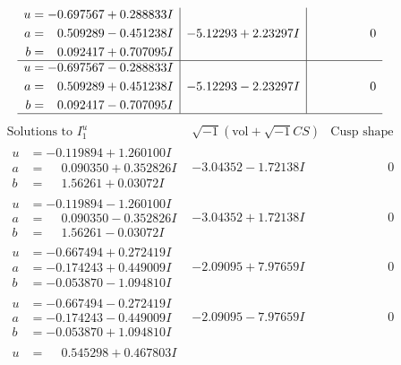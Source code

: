 \documentclass[1p]{elsarticle_modified}
\theoremstyle{definition}
\newcommand{\I}{\sqrt{-1}}
\begin{document}
$$\begin{array}{c|c|c}
\begin{aligned}
u &= -0.697567 + 0.288833 I \\
a &= \phantom{-}0.509289 - 0.451238 I \\
b &= \phantom{-}0.092417 + 0.707095 I\end{aligned}
 & -5.12293 + 2.23297 I & \phantom{-0.000000 } 0 \\ \hline\begin{aligned}
u &= -0.697567 - 0.288833 I \\
a &= \phantom{-}0.509289 + 0.451238 I \\
b &= \phantom{-}0.092417 - 0.707095 I\end{aligned}
 & -5.12293 - 2.23297 I & \phantom{-0.000000 } 0\\
 \hline 
 \end{array}$$\newpage$$\begin{array}{c|c|c}  
\text{Solutions to }I^u_{1}& \I (\text{vol} + \sqrt{-1}CS) & \text{Cusp shape}\\
 \hline 
\begin{aligned}
u &= -0.119894 + 1.260100 I \\
a &= \phantom{-}0.090350 + 0.352826 I \\
b &= \phantom{-}1.56261 + 0.03072 I\end{aligned}
 & -3.04352 - 1.72138 I & \phantom{-0.000000 } 0 \\ \hline\begin{aligned}
u &= -0.119894 - 1.260100 I \\
a &= \phantom{-}0.090350 - 0.352826 I \\
b &= \phantom{-}1.56261 - 0.03072 I\end{aligned}
 & -3.04352 + 1.72138 I & \phantom{-0.000000 } 0 \\ \hline\begin{aligned}
u &= -0.667494 + 0.272419 I \\
a &= -0.174243 + 0.449009 I \\
b &= -0.053870 - 1.094810 I\end{aligned}
 & -2.09095 + 7.97659 I & \phantom{-0.000000 } 0 \\ \hline\begin{aligned}
u &= -0.667494 - 0.272419 I \\
a &= -0.174243 - 0.449009 I \\
b &= -0.053870 + 1.094810 I\end{aligned}
 & -2.09095 - 7.97659 I & \phantom{-0.000000 } 0 \\ \hline\begin{aligned}
u &= \phantom{-}0.545298 + 0.467803 I \\

\end{aligned}
\end{array}$$
\end{document}
